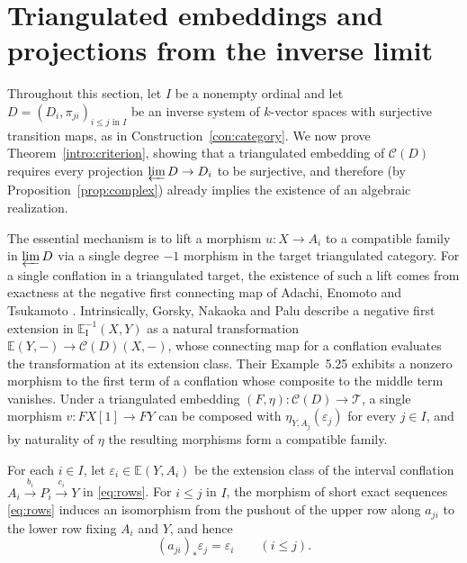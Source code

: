 \documentclass[a4paper,reqno,10pt]{amsart}
\numberwithin{equation}{section}
\theoremstyle{definition}
\newcommand{\C}{\mathcal C}
\newcommand{\E}{\mathbb E}
\newcommand{\T}{\mathcal T}
\begin{document}
\section{Triangulated embeddings and projections from the inverse limit}\label{sec:criterion}

Throughout this section, let $I$ be a nonempty ordinal and let
$D=(D_i,\pi_{ji})_{i\le j\text{ in }I}$ be an inverse system of $k$-vector
spaces with surjective transition maps, as in Construction~\ref{con:category}.
We now prove Theorem~\ref{intro:criterion}, showing that a triangulated
embedding of $\C(D)$ requires every projection $\varprojlim D\to D_i$ to be
surjective, and therefore (by Proposition~\ref{prop:complex}) already implies
the existence of an algebraic realization.

The essential mechanism is to lift a morphism $u:X\to A_i$ to a compatible
family in $\varprojlim D$ via a single degree $-1$ morphism in the target
triangulated category. For a single conflation in a triangulated target, the
existence of such a lift comes from exactness at the negative first connecting
map of Adachi, Enomoto and Tsukamoto \cite[Definition~2.3 (NE2) and
Example~2.4]{AET}. Intrinsically,
Gorsky, Nakaoka and Palu \cite[Definition~5.1(1), Remark~5.2 and
Definition~5.3]{GNP} describe a negative first extension in
$\E_{\mathrm I}^{-1}(X,Y)$ as a natural transformation
$\E(Y,-)\to\C(D)(X,-)$, whose connecting map for a conflation evaluates the
transformation at its extension class. Their Example~5.25 exhibits a nonzero
morphism to the first term of a conflation whose composite to the middle term
vanishes. Under a triangulated embedding $(F,\eta):\C(D)\to\T$, a
single morphism $v:FX[1]\to FY$ can be composed with $\eta_{Y,A_j}(\varepsilon_j)$
for every $j\in I$, and by naturality of $\eta$ the resulting morphisms form a
compatible family.

For each $i\in I$, let $\varepsilon_i\in\E(Y,A_i)$ be the extension class of
the interval conflation $A_i\xrightarrow{b_i}P_i\xrightarrow{c_i}Y$ in
\eqref{eq:rows}. For $i\le j$ in $I$, the morphism of short exact sequences
\eqref{eq:rows} induces an isomorphism from the pushout of the upper row along
$a_{ji}$ to the lower row fixing $A_i$ and $Y$, and hence
\begin{equation}\label{eq:push}
    (a_{ji})_*\varepsilon_j=\varepsilon_i\qquad (i\le j).
\end{equation}
\end{document}
